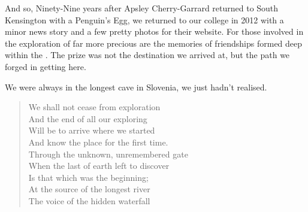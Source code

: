 
And so, Ninety-Nine years after Apsley Cherry-Garrard returned to South
Kensington with a Penguin's Egg, we returned to our college in 2012 with
a minor news story and a few pretty photos for their website. For those
involved in the exploration of  far more precious are
the memories of friendships formed deep within the . The
prize was not the destination we arrived at, but the path we forged in
getting here.

We were always in the longest cave in Slovenia, we just hadn't realised.


\newpage
\begin{verse}
We shall not cease from exploration  \\
And the end of all our exploring  \\
Will be to arrive where we started  \\
And know the place for the first time. 
 \\
Through the unknown, unremembered gate  \\
When the last of earth left to discover  \\
Is that which was the beginning;  \\
At the source of the longest river  \\
The voice of the hidden waterfall \\
\end{verse}

